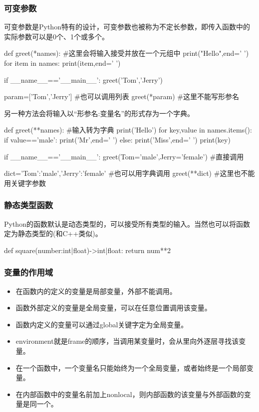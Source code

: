     \subsubsection{可变参数}
      可变参数是Python特有的设计，可变参数也被称为不定长参数，即传入函数中的实际参数可以是0个、1个或多个。
      \begin{codeblock}[language=python, caption={variable parameters}]
        def greet(*names): #这里会将输入接受并放在一个元组中
          print("Hello",end=' ')
          for item in names:
            print(item,end=' ')

        if __name__=='__main__':
          greet('Tom','Jerry')

          param=['Tom','Jerry'] #也可以调用列表
          greet(*param) #这里不能写形参名
      \end{codeblock}

      另一种方法会将输入以``形参名:变量名''的形式存为一个字典。
      \begin{codeblock}[language=python, caption={other variable parameters}]
        def greet(**names): #输入转为字典
          print('Hello')
          for key,value in names.items():
            if value=='male':
              print('Mr',end=' ')
            else:
              print('Miss',end=' ')
            print(key)

        if __name__=='__main__':
          greet(Tom='male',Jerry='female') #直接调用

          dict={'Tom':'male','Jerry':'female'} #也可以用字典调用
          greet(**dict) #这里也不能用关键字参数
      \end{codeblock}

    \subsubsection{静态类型函数}
      Python的函数默认是动态类型的，可以接受所有类型的输入。当然也可以将函数定为静态类型的(和C++类似)。
      \begin{codeblock}[language=python, caption={static functions}]
        def square(number:int|float)->int|float:
          return num**2
      \end{codeblock}

    \subsubsection{变量的作用域}
      \begin{itemize}
        \item 在函数内的定义的变量是局部变量，外部不能调用。
        \item 函数外部定义的变量是全局变量，可以在任意位置调用该变量。
        \item 函数内定义的变量可以通过global关键字定为全局变量。
        \item environment就是frame的顺序，当调用某变量时，会从里向外逐层寻找该变量。
        \item 在一个函数中，一个变量名只能始终为一个全局变量，或者始终是一个局部变量。
        \item 在内部函数中的变量名前加上nonlocal，则内部函数的该变量与外部函数的变量是同一个。
      \end{itemize}

